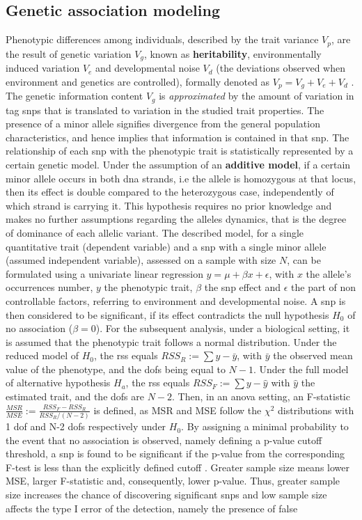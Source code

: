 \subsection{Genetic association modeling}
Phenotypic differences among individuals, described by the trait variance $V_p$,  are the result of genetic variation $V_g$, known as \textbf{heritability}, environmentally induced variation $V_e$ and developmental noise $V_d$ (the deviations observed when environment and genetics are controlled), formally denoted as $V_p=V_g+V_e+V_d$ \cite{Vogt2020}. The genetic information content $V_g$ is \textit{approximated} by the amount of variation in tag \acp{snp} that is translated to variation in the studied trait properties.  The presence of a minor allele signifies divergence from the general population characteristics, and hence implies that information is contained in that \ac{snp}.  The relationship of each \ac{snp} with the phenotypic trait is statistically represented by a certain genetic model. Under the assumption of an \textbf{additive model}, if a certain minor allele occurs in both \ac{dna} strands, i.e the allele is homozygous at that locus, then its effect is double compared to the heterozygous case, independently of which strand is carrying it. This hypothesis requires no prior knowledge and makes no further assumptions regarding the alleles dynamics, that is the degree of dominance of each allelic variant. The described model, for a single quantitative trait (dependent variable) and a \ac{snp} with a single minor allele (assumed independent variable), assessed on a sample with size $N$, can be formulated using a univariate linear regression $y = \mu + \beta x + \epsilon$, with $x$ the allele's occurrences number, $y$ the phenotypic trait, $\beta$ the \ac{snp} effect and $\epsilon$ the part of non controllable factors, referring to environment and developmental noise. A \ac{snp} is then considered to be significant, if its effect contradicts the null hypothesis $H_0$ of no association ($\beta=0$). For the subsequent analysis, under a biological setting, it is assumed that the phenotypic trait follows a normal distribution. Under the reduced model of $H_0$, the \ac{rss} equals $RSS_R:=\sum{y-\bar{y}}$, with $\bar{y}$ the observed mean value of the phenotype, and the \acp{dof} being equal to $N-1$. Under the full model of alternative hypothesis $H_a$, the \ac{rss} equals $RSS_F:=\sum{y-\hat{y}}$ with $\hat{y}$ the estimated trait, and the \acp{dof} are $N-2$. Then, in an \ac{anova} setting, an F-statistic $\frac{MSR}{MSE}:=\frac{RSS_F-RSS_R}{RSS_R/(N-2)}$ is defined, as MSR and MSE follow the $\chi^2$ distributions with 1 \ac{dof} and N-2 \acp{dof} respectively under $H_0$. By assigning a minimal probability to the event that no association is observed, namely defining a p-value cutoff threshold, a \ac{snp} is found to be significant if the p-value from the corresponding F-test is less than the explicitly defined cutoff \cite{AlejandroGonzalez-Chica2015}. Greater sample size means lower MSE, larger F-statistic and, consequently, lower p-value. Thus, greater sample size increases the chance of discovering significant \acp{snp} and low sample size affects the type I error of the detection, namely the presence of false 